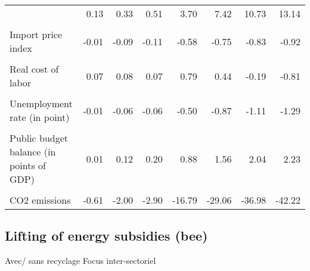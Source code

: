 \documentclass[
]{article}
\begin{document}
\begin{longtable}[t]{lrrrrrrr}
{Intermediate consumption price index & 0.13 & 0.33 & 0.51 & 3.70 & 7.42 & 10.73 & 13.14\\
\cellcolor{gray!6}{Export price index} & \cellcolor{gray!6}{0.01} & \cellcolor{gray!6}{0.09} & \cellcolor{gray!6}{0.21} & \cellcolor{gray!6}{1.02} & \cellcolor{gray!6}{2.91} & \cellcolor{gray!6}{5.02} & \cellcolor{gray!6}{6.80}\\
Import price index & -0.01 & -0.09 & -0.11 & -0.58 & -0.75 & -0.83 & -0.92\\
\cellcolor{gray!6}{Gross nominal wage} & \cellcolor{gray!6}{0.00} & \cellcolor{gray!6}{0.10} & \cellcolor{gray!6}{0.27} & \cellcolor{gray!6}{1.03} & \cellcolor{gray!6}{3.32} & \cellcolor{gray!6}{6.26} & \cellcolor{gray!6}{8.92}\\
Real cost of labor & 0.07 & 0.08 & 0.07 & 0.79 & 0.44 & -0.19 & -0.81\\
\cellcolor{gray!6}{Wage employment rate (in thousands)} & \cellcolor{gray!6}{0.70} & \cellcolor{gray!6}{3.82} & \cellcolor{gray!6}{4.29} & \cellcolor{gray!6}{34.47} & \cellcolor{gray!6}{63.39} & \cellcolor{gray!6}{82.96} & \cellcolor{gray!6}{97.35}\\
Unemployment rate (in point) & -0.01 & -0.06 & -0.06 & -0.50 & -0.87 & -1.11 & -1.29\\
\cellcolor{gray!6}{Trade balance (in point of GDP)} & \cellcolor{gray!6}{0.03} & \cellcolor{gray!6}{0.15} & \cellcolor{gray!6}{0.23} & \cellcolor{gray!6}{1.17} & \cellcolor{gray!6}{1.89} & \cellcolor{gray!6}{2.12} & \cellcolor{gray!6}{2.07}\\
Public budget balance (in points of GDP) & 0.01 & 0.12 & 0.20 & 0.88 & 1.56 & 2.04 & 2.23\\
\cellcolor{gray!6}{Public debt (in points of GDP)} & \cellcolor{gray!6}{-0.05} & \cellcolor{gray!6}{-0.49} & \cellcolor{gray!6}{-1.25} & \cellcolor{gray!6}{-4.81} & \cellcolor{gray!6}{-10.69} & \cellcolor{gray!6}{-17.51} & \cellcolor{gray!6}{-24.33}\\
CO2 emissions & -0.61 & -2.00 & -2.90 & -16.79 & -29.06 & -36.98 & -42.22\\*
\end{longtable}

\hypertarget{lifting-of-energy-subsidies-bee}{%
\subsection{Lifting of energy subsidies
(bee)}\label{lifting-of-energy-subsidies-bee}}

Avec/ sans recyclage Focus inter-sectoriel
\end{document}
